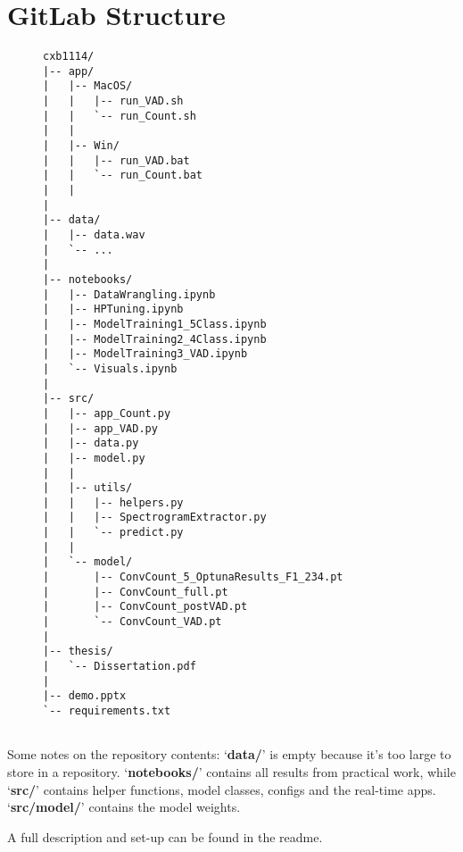 \chapter{GitLab Structure}
\begin{figure}[H]
\centering
\begin{verbatim}
cxb1114/
|-- app/
|   |-- MacOS/
|   |   |-- run_VAD.sh
|   |   `-- run_Count.sh
|   |
|   |-- Win/
|   |   |-- run_VAD.bat
|   |   `-- run_Count.bat
|   |
|
|-- data/
|   |-- data.wav
|   `-- ...
|
|-- notebooks/
|   |-- DataWrangling.ipynb
|   |-- HPTuning.ipynb
|   |-- ModelTraining1_5Class.ipynb
|   |-- ModelTraining2_4Class.ipynb
|   |-- ModelTraining3_VAD.ipynb
|   `-- Visuals.ipynb
|
|-- src/
|   |-- app_Count.py
|   |-- app_VAD.py
|   |-- data.py
|   |-- model.py
|   |
|   |-- utils/
|   |   |-- helpers.py
|   |   |-- SpectrogramExtractor.py
|   |   `-- predict.py
|   |
|   `-- model/
|       |-- ConvCount_5_OptunaResults_F1_234.pt
|       |-- ConvCount_full.pt
|       |-- ConvCount_postVAD.pt
|       `-- ConvCount_VAD.pt
|
|-- thesis/
|   `-- Dissertation.pdf
|
|-- demo.pptx
`-- requirements.txt


\end{verbatim}
\end{figure}

Some notes on the repository contents: `\textbf{data/}' is empty because it's too large to store in a repository. `\textbf{notebooks/}' contains all results from practical work, while `\textbf{src/}' contains helper functions, model classes, configs and the real-time apps. `\textbf{src/model/}' contains the model weights.\newline

\noindent A full description and set-up can be found in the readme.
